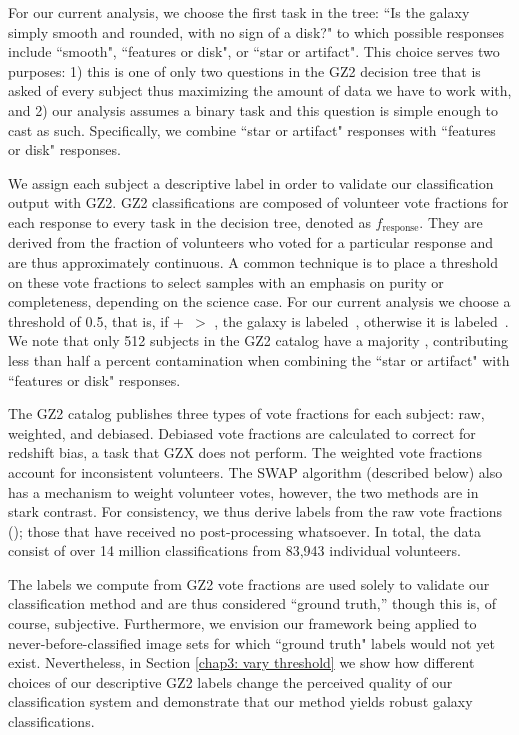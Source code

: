 For our current analysis, we choose the first task in the tree: ``Is the galaxy simply smooth and rounded, with no sign of a disk?" to which possible responses include ``smooth", ``features or disk", or ``star or artifact". This choice serves two purposes: 1) this is one of only two questions in the GZ2 decision tree that is asked of every subject thus maximizing the amount of data we have to work with, and 2) our analysis assumes a binary task and this question is simple enough to cast as such. Specifically, we combine ``star or artifact" responses with ``features or disk" responses.

We assign each subject a descriptive label in order to validate our classification output with GZ2. GZ2 classifications are composed of volunteer vote fractions for each response to every task in the decision tree, denoted as $f_{\mathrm{response}}$. They are derived from the fraction of volunteers who voted for a particular response and are thus approximately continuous. A common technique is to place a threshold on these vote fractions to select samples with an emphasis on purity or completeness, depending on the science case. For our current analysis we choose a threshold of 0.5, that is, if \ffeat+\fstar~$ >$ \fsmooth, the galaxy is labeled~\feat, otherwise it is labeled~\notfeat. We note that only 512 subjects in the GZ2 catalog have a majority \fstar, contributing less than half a percent contamination when combining the ``star or artifact" with ``features or disk" responses.

The GZ2 catalog publishes three types of vote fractions for each subject: raw, weighted, and debiased. Debiased vote fractions are calculated to correct for redshift bias, a task that GZX does not perform. The weighted vote fractions account for inconsistent volunteers. The SWAP algorithm (described below) also has a mechanism to weight volunteer votes, however, the two methods are in stark contrast. For consistency, we thus derive labels from the raw vote fractions (\raw); those that have received no post-processing whatsoever. In total, the data consist of over 14 million classifications from 83,943 individual volunteers. 

The labels we compute from GZ2 vote fractions are used solely to validate our classification method and are thus considered ``ground truth,'' though this is, of course, subjective. Furthermore, we envision our framework being applied to never-before-classified image sets for which ``ground truth" labels would not yet exist. Nevertheless, in Section \ref{chap3: vary threshold} we show how different choices of our descriptive GZ2 labels change the perceived quality of our classification system and demonstrate that our method yields robust galaxy classifications.


